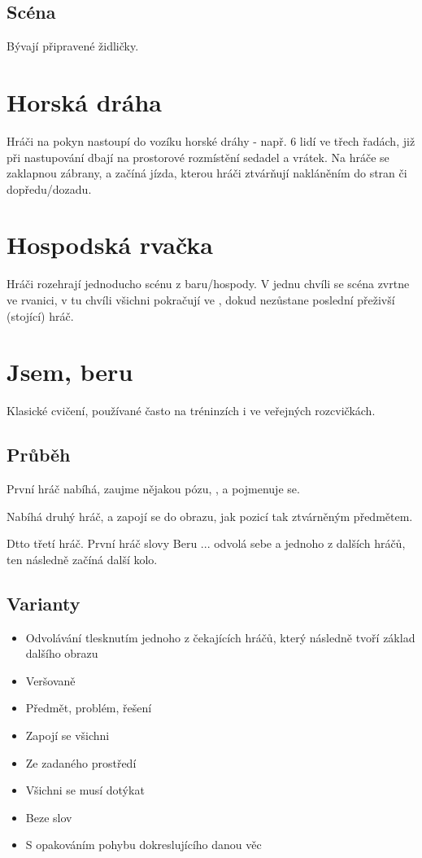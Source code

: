 \subsection{Scéna} Bývají připravené židličky. 
 
 
\needspace{5cm} \section{Horská dráha} \label{horská dráha} Hráči na pokyn nastoupí do vozíku horské dráhy - např. 6 lidí ve třech řadách, 
již při nastupování dbají na prostorové rozmístění sedadel a vrátek. 
Na hráče se zaklapnou zábrany, a začíná jízda, kterou hráči ztvárňují nakláněním do stran či dopředu/dozadu. 
 
\needspace{5cm} \section{Hospodská rvačka} \label{hospodská rvačka} Hráči rozehrají jednoducho scénu z baru/hospody. V jednu chvíli se scéna zvrtne ve rvanici, v tu chvíli všichni pokračují ve , dokud nezůstane poslední přeživší (stojící) hráč. 
 
 
 
\needspace{5cm} \section{Jsem, beru} \label{jsem, beru} Klasické cvičení, používané často na tréninzích i ve veřejných rozcvičkách. 
\subsection{Průběh} První hráč nabíhá, zaujme nějakou pózu,  , a pojmenuje se. 
 
Nabíhá druhý hráč, a zapojí se do obrazu, jak pozicí tak ztvárněným předmětem.  
 
Dtto třetí hráč. 
První hráč slovy Beru ... odvolá sebe a jednoho z dalších hráčů, ten následně začíná další kolo. 
\subsection{Varianty} \begin{itemize}
\item Odvolávání tlesknutím jednoho z čekajících hráčů, který následně tvoří základ dalšího obrazu
\item Veršovaně
\item Předmět, problém, řešení
\item Zapojí se všichni
\item Ze zadaného prostředí
\item Všichni se musí dotýkat
\item Beze slov
\item S opakováním  pohybu dokreslujícího danou věc
\end{itemize}
 
